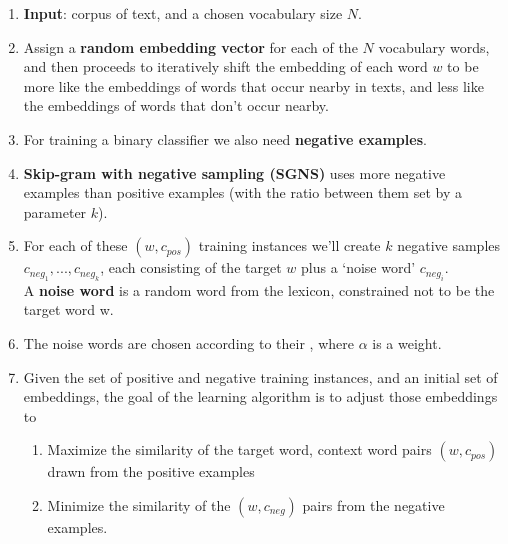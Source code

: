 \begin{enumerate}
    \item \textbf{Input}: corpus of text, and a chosen vocabulary size $N$.

    \item Assign a \textbf{random embedding vector} for each of the $N$ vocabulary words, and then proceeds to iteratively shift the embedding of each word $w$ to be more like the embeddings of words that occur nearby in texts, and less like the embeddings of words that don’t occur nearby.

    \item For training a binary classifier we also need \textbf{negative examples}.
    
    \item \textbf{Skip-gram with negative sampling (SGNS)} uses more negative examples than positive examples (with the ratio between them set by a parameter $k$).

    \item For each of these $(w, c_{pos})$ training instances we’ll create $k$ negative samples $c_{neg_1},...,c_{neg_k}$, each consisting of the target $w$ plus a ‘noise word’ $c_{neg_i}$.\\
    A \textbf{noise word} is a random word from the lexicon, constrained not to be the target word w.

    \item The noise words are chosen according to their , where $\alpha$ is a weight.

    \item Given the set of positive and negative training instances, and an initial set of embeddings, the goal of the learning algorithm is to adjust those embeddings to
    \begin{enumerate}
        \item Maximize the similarity of the target word, context word pairs $(w, c_{pos})$ drawn from the positive examples
        \item  Minimize the similarity of the $(w, c_{neg})$ pairs from the negative examples.
    \end{enumerate}


\end{enumerate}
